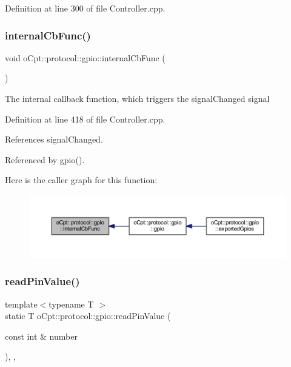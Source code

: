 Definition at line 300 of file Controller.\+cpp.

\hypertarget{classo_cpt_1_1protocol_1_1gpio_aac8bfbf4530ff929ea83f48e970d0598}{}\label{classo_cpt_1_1protocol_1_1gpio_aac8bfbf4530ff929ea83f48e970d0598} 
\subsubsection{\texorpdfstring{internal\+Cb\+Func()}{internalCbFunc()}}
{\footnotesize\ttfamily void o\+Cpt\+::protocol\+::gpio\+::internal\+Cb\+Func (\begin{DoxyParamCaption}{ }\end{DoxyParamCaption})\hspace{0.3cm}{\ttfamily [private]}}

The internal callback function, which triggers the signal\+Changed signal 

Definition at line 418 of file Controller.\+cpp.



References signal\+Changed.



Referenced by gpio().

Here is the caller graph for this function\+:\nopagebreak
\begin{figure}[H]
\begin{center}
\leavevmode
\includegraphics[width=350pt]{classo_cpt_1_1protocol_1_1gpio_aac8bfbf4530ff929ea83f48e970d0598_icgraph}
\end{center}
\end{figure}
\hypertarget{classo_cpt_1_1protocol_1_1gpio_aa604ec2008a852ec0f378b4c98fa3a3c}{}\label{classo_cpt_1_1protocol_1_1gpio_aa604ec2008a852ec0f378b4c98fa3a3c} 
\subsubsection{\texorpdfstring{read\+Pin\+Value()}{readPinValue()}\hspace{0.1cm}{\footnotesize\ttfamily [1/2]}}
{\footnotesize\ttfamily template$<$typename T $>$ \\
static T o\+Cpt\+::protocol\+::gpio\+::read\+Pin\+Value (\begin{DoxyParamCaption}\item[{const int \&}]{number }\end{DoxyParamCaption})\hspace{0.3cm}{\ttfamily [inline]}, {\ttfamily [static]}, {\ttfamily [private]}}

